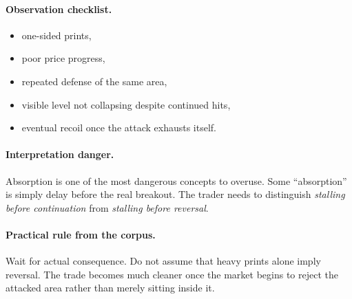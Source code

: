 \paragraph{Observation checklist.}
\begin{itemize}
\item one-sided prints,
\item poor price progress,
\item repeated defense of the same area,
\item visible level not collapsing despite continued hits,
\item eventual recoil once the attack exhausts itself.
\end{itemize}

\paragraph{Interpretation danger.} Absorption is one of the most dangerous concepts to overuse. Some ``absorption'' is simply delay before the real breakout. The trader needs to distinguish \emph{stalling before continuation} from \emph{stalling before reversal}.

\paragraph{Practical rule from the corpus.} Wait for actual consequence. Do not assume that heavy prints alone imply reversal. The trade becomes much cleaner once the market begins to reject the attacked area rather than merely sitting inside it.

